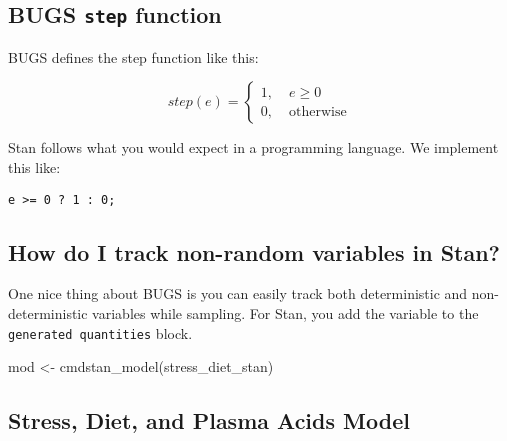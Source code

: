 \documentclass[
  letterpaper,
  DIV=11,
  numbers=noendperiod]{scrreprt}
\newenvironment{Shaded}{\begin{snugshade}}{\end{snugshade}}
\newcommand{\FunctionTok}[1]{\textcolor[rgb]{0.28,0.35,0.67}{#1}}
\newcommand{\NormalTok}[1]{\textcolor[rgb]{0.00,0.23,0.31}{#1}}
\newcommand{\OtherTok}[1]{\textcolor[rgb]{0.00,0.23,0.31}{#1}}
\begin{document}
\hypertarget{bugs-step-function}{%
\subsection*{\texorpdfstring{BUGS \texttt{step}
function}{BUGS step function}}\label{bugs-step-function}}

BUGS defines the step function like this:

\[
step(e) = \left\{
\begin{array}{rl}
  1, &\; e \geq 0\\
  0, &\; \text{otherwise}
\end{array}\right.
\]

Stan follows what you would expect in a programming language. We
implement this like:

\texttt{e\ \textgreater{}=\ 0\ ?\ 1\ :\ 0;}

\hypertarget{how-do-i-track-non-random-variables-in-stan}{%
\subsection*{How do I track non-random variables in
Stan?}\label{how-do-i-track-non-random-variables-in-stan}}

One nice thing about BUGS is you can easily track both deterministic and
non-deterministic variables while sampling. For Stan, you add the
variable to the \texttt{generated\ quantities} block.

\begin{Shaded}
\begin{Highlighting}[]
\NormalTok{mod }\OtherTok{\textless{}{-}} \FunctionTok{cmdstan\_model}\NormalTok{(stress\_diet\_stan)}
\end{Highlighting}
\end{Shaded}

\hypertarget{stress-diet-and-plasma-acids-model}{%
\subsection*{Stress, Diet, and Plasma Acids
Model}\label{stress-diet-and-plasma-acids-model}}
\end{document}
